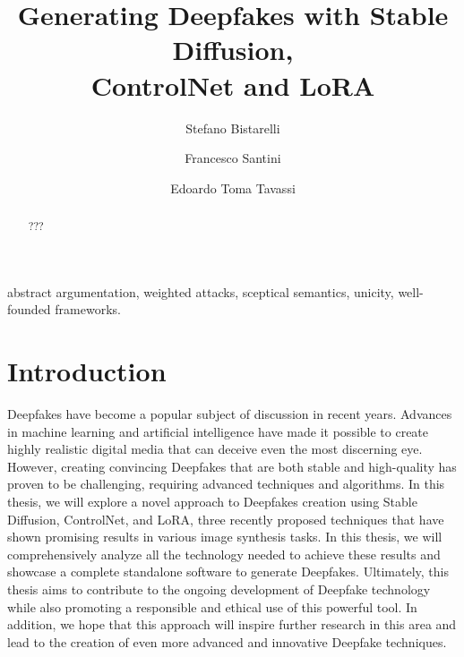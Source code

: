 \documentclass[preprint]{elsarticle}
\begin{document}
\begin{frontmatter}


\title{Generating Deepfakes with Stable Diffusion,\\ ControlNet and LoRA}





\author[perugia]{Stefano Bistarelli}
\author[perugia]{Francesco Santini}
\author[perugia]{Edoardo Toma Tavassi}


\address[perugia]{Dipartimento di Matematica e  Informatica, University of Perugia, Italy}




\begin{abstract} 
???
\end{abstract}

\begin{keyword}
abstract argumentation, weighted attacks, sceptical semantics, unicity, well-founded frameworks.
\end{keyword}
\end{frontmatter}



\section{Introduction}


Deepfakes have become a popular subject of discussion in recent years. 
Advances in machine learning and artificial intelligence have made it possible to 
create highly realistic digital media that can deceive even the most discerning eye. 
However, creating convincing Deepfakes that are both stable and high-quality has proven 
to be challenging, requiring advanced techniques and algorithms. 
In this thesis, we will explore a novel approach to Deepfakes creation using 
Stable Diffusion, ControlNet, and LoRA, three recently proposed techniques that 
have shown promising results in various image synthesis tasks. 
In this thesis, we will comprehensively analyze all the technology needed to achieve these 
results and showcase a complete standalone software to generate Deepfakes. 
Ultimately, this thesis aims to contribute to the ongoing development of 
Deepfake technology while also promoting a responsible and ethical use of this powerful tool. 
In addition, we hope that this approach will inspire further research in this area and 
lead to the creation of even more advanced and innovative Deepfake techniques.
\end{document}
